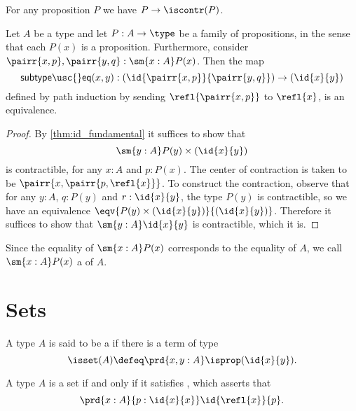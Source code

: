 \begin{cor}
For any proposition $P$ we have $P\to\iscontr(P)$.
\end{cor}

\begin{thm}
Let $A$ be a type and let $P:A\to\type$ be a family of propositions, in the sense that each $P(x)$ is a proposition. Furthermore, consider $\pairr{x,p},\pairr{y,q}:\sm{x:A}P(x)$. Then the map
\begin{equation*}
\mathsf{subtype\usc{}eq}(x,y) : (\id{\pairr{x,p}}{\pairr{y,q}})\to(\id{x}{y})
\end{equation*}
defined by path induction by sending $\refl{\pairr{x,p}}$ to $\refl{x}$, is an equivalence.
\end{thm}

\begin{proof}
By \autoref{thm:id_fundamental} it suffices to show that
\begin{equation*}
\sm{y:A}P(y)\times(\id{x}{y})
\end{equation*}
is contractible, for any $x:A$ and $p:P(x)$. The center of contraction is taken to be $\pairr{x,\pairr{p,\refl{x}}}$. To construct the contraction, observe that for any $y:A$, $q:P(y)$ and $r:\id{x}{y}$, the type $P(y)$ is contractible, so we have an equivalence $\eqv{P(y)\times(\id{x}{y})}{(\id{x}{y})}$. Therefore it suffices to show that $\sm{y:A}\id{x}{y}$ is contractible, which it is.
\end{proof}

Since the equality of $\sm{x:A}P(x)$ corresponds to the equality of $A$, we call $\sm{x:A}P(x)$ a  of $A$.

\section{Sets}

\begin{defn}
A type $A$ is said to be a  if there is a term of type
\begin{equation*}
\isset(A)\defeq \prd{x,y:A}\isprop(\id{x}{y}).
\end{equation*}
\end{defn}

\begin{lem}
A type $A$ is a set if and only if it satisfies , which asserts that
\begin{equation*}
\prd{x:A}{p:\id{x}{x}}\id{\refl{x}}{p}.
\end{equation*}
\end{lem}

